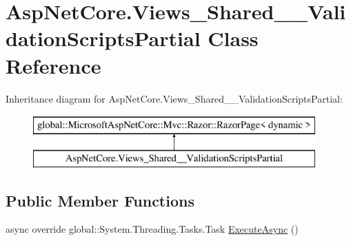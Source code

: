 \hypertarget{class_asp_net_core_1_1_views___shared_____validation_scripts_partial}{}\section{Asp\+Net\+Core.\+Views\+\_\+\+Shared\+\_\+\+\_\+\+Validation\+Scripts\+Partial Class Reference}
\label{class_asp_net_core_1_1_views___shared_____validation_scripts_partial}
Inheritance diagram for Asp\+Net\+Core.\+Views\+\_\+\+Shared\+\_\+\+\_\+\+Validation\+Scripts\+Partial\+:\begin{figure}[H]
\begin{center}
\leavevmode
\includegraphics[height=2.000000cm]{class_asp_net_core_1_1_views___shared_____validation_scripts_partial}
\end{center}
\end{figure}
\subsection*{Public Member Functions}
\begin{DoxyCompactItemize}
\item 
async override global\+::\+System.\+Threading.\+Tasks.\+Task \mbox{\hyperlink{class_asp_net_core_1_1_views___shared_____validation_scripts_partial_aca45bee43cd2ddef240d2b1f1f2385c9}{Execute\+Async}} ()
\end{DoxyCompactItemize}
